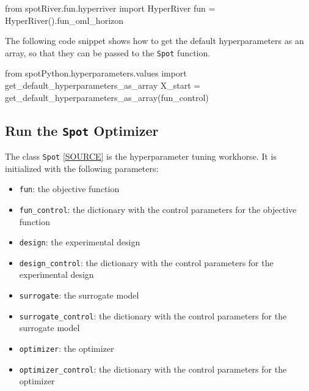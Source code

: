 \documentclass[
  letterpaper,
  DIV=11,
  numbers=noendperiod]{scrreprt}
\newenvironment{Shaded}{\begin{snugshade}}{\end{snugshade}}
\newcommand{\ImportTok}[1]{\textcolor[rgb]{0.00,0.46,0.62}{#1}}
\newcommand{\NormalTok}[1]{\textcolor[rgb]{0.00,0.23,0.31}{#1}}
\newcommand{\OperatorTok}[1]{\textcolor[rgb]{0.37,0.37,0.37}{#1}}
\providecommand{\tightlist}{%
  \setlength{\itemsep}{0pt}\setlength{\parskip}{0pt}}\usepackage{longtable,booktabs,array}
\begin{document}
\begin{Shaded}
\begin{Highlighting}[]
\ImportTok{from}\NormalTok{ spotRiver.fun.hyperriver }\ImportTok{import}\NormalTok{ HyperRiver}
\NormalTok{fun }\OperatorTok{=}\NormalTok{ HyperRiver().fun\_oml\_horizon}
\end{Highlighting}
\end{Shaded}

The following code snippet shows how to get the default hyperparameters
as an array, so that they can be passed to the \texttt{Spot} function.

\begin{Shaded}
\begin{Highlighting}[]
\ImportTok{from}\NormalTok{ spotPython.hyperparameters.values }\ImportTok{import}\NormalTok{ get\_default\_hyperparameters\_as\_array}
\NormalTok{X\_start }\OperatorTok{=}\NormalTok{ get\_default\_hyperparameters\_as\_array(fun\_control)}
\end{Highlighting}
\end{Shaded}

\subsection{\texorpdfstring{Run the \texttt{Spot}
Optimizer}{Run the Spot Optimizer}}\label{run-the-spot-optimizer}

The class \texttt{Spot}
\href{https://github.com/sequential-parameter-optimization/spotPython/blob/main/src/spotPython/spot/spot.py}{{[}SOURCE{]}}
is the hyperparameter tuning workhorse. It is initialized with the
following parameters:

\begin{itemize}
\tightlist
\item
  \texttt{fun}: the objective function
\item
  \texttt{fun\_control}: the dictionary with the control parameters for
  the objective function
\item
  \texttt{design}: the experimental design
\item
  \texttt{design\_control}: the dictionary with the control parameters
  for the experimental design
\item
  \texttt{surrogate}: the surrogate model
\item
  \texttt{surrogate\_control}: the dictionary with the control
  parameters for the surrogate model
\item
  \texttt{optimizer}: the optimizer
\item
  \texttt{optimizer\_control}: the dictionary with the control
  parameters for the optimizer
\end{itemize}
\end{document}
